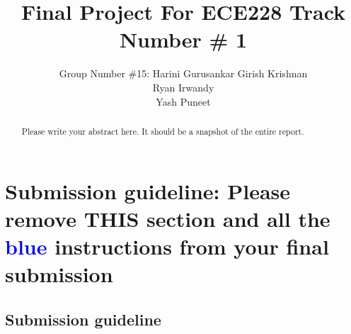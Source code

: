 \documentclass{article}
\title{Final Project For ECE228 Track Number \# 1}
\author{%
  Group Number \#15: Harini Gurusankar
  \And
  Girish Krishnan \\
  \And
  Ryan Irwandy  \\
  \And
  Yash Puneet \\
}
\begin{document}
\maketitle

\begin{abstract}
Please write your abstract here. It should be a snapshot of the entire report.
\end{abstract}




\section*{Submission guideline: Please remove THIS section and all the \textcolor{blue}{blue} instructions from your final submission}
\subsection*{Submission guideline}
\end{document}
